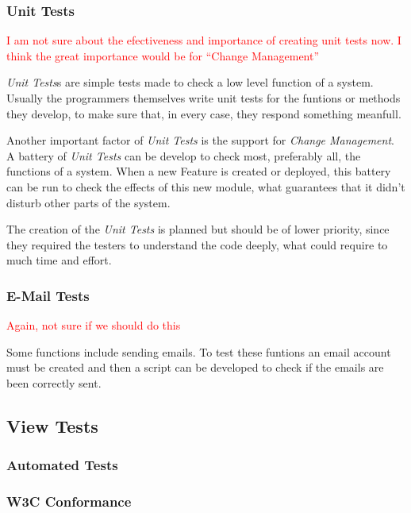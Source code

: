 \documentclass[11pt]{article}
\begin{document}
\subsubsection*{Unit Tests}

\indent

\textcolor{red}{I am not sure about the efectiveness and importance of creating unit tests now. I think the great importance would be for ``Change Management''}

{\it Unit Tests}s are simple tests made to check a low level function of a system. Usually the programmers themselves write unit tests for the funtions or methods they develop, to make sure that, in every case, they respond something meanfull. 

Another important factor of {\it Unit Tests} is the support for {\it Change Management}. A battery of {\it Unit Tests} can be develop to check most, preferably all, the functions of a system. When a new Feature is created or deployed, this battery can be run to check the effects of this new module, what guarantees that it didn't disturb other parts of the system.

The creation of the {\it Unit Tests} is planned but should be of lower priority, since they required the testers to understand the code deeply, what could require to much time and effort.

\subsubsection*{E-Mail Tests}

\indent

\textcolor{red}{Again, not sure if we should do this}

Some functions include sending emails. To test these funtions an email account must be created and then a script can be developed to check if the emails are been correctly sent.


\subsection{View Tests}

\indent

\subsubsection{Automated Tests}

\subsubsection*{W3C Conformance}
\end{document}
